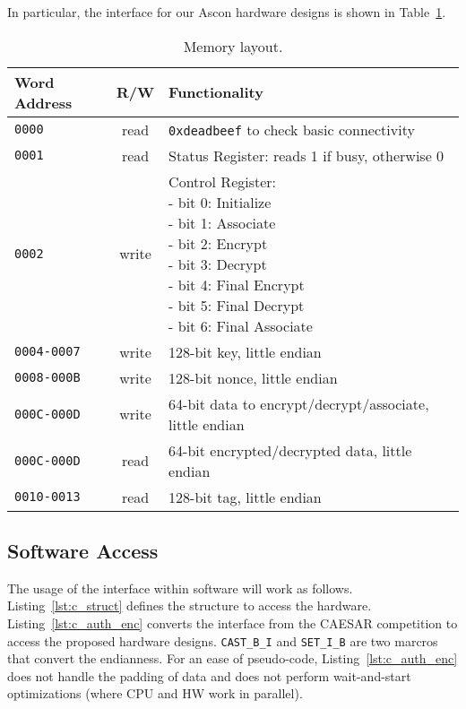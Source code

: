 \documentclass[runningheads]{llncs}
\begin{document}
In particular, the interface for our Ascon hardware designs is shown in Table~\ref{tbl:mem-layout}.

\begin{table}[htb]
\caption{Memory layout.}
\label{tbl:mem-layout}
\centering
\begin{tabular}{|l|c|l|} \hline
Word Address & R/W & Functionality \\ \hline
\texttt{0000} & read & \texttt{0xdeadbeef} to check basic connectivity \\
\texttt{0001} & read & Status Register: reads 1 if busy, otherwise 0 \\
\texttt{0002} & write & \specialcell[t]{Control Register:\\- bit 0: Initialize\\- bit 1: Associate\\- bit 2: Encrypt\\- bit 3: Decrypt\\- bit 4: Final Encrypt\\- bit 5: Final Decrypt\\- bit 6: Final Associate} \\
\texttt{0004-0007} & write & 128-bit key, little endian \\
\texttt{0008-000B} & write & 128-bit nonce, little endian \\
\texttt{000C-000D} & write & 64-bit data to encrypt/decrypt/associate, little endian \\
\texttt{000C-000D} & read & 64-bit encrypted/decrypted data, little endian \\
\texttt{0010-0013} & read & 128-bit tag, little endian \\
\hline
\end{tabular}
\end{table}%

\subsection{Software Access}

The usage of the interface within software will work as follows. Listing~\ref{lst:c_struct} defines the structure to access the hardware. Listing~\ref{lst:c_auth_enc} converts the interface from the CAESAR competition to access the proposed hardware designs. \texttt{CAST\_B\_I} and  \texttt{SET\_I\_B} are two marcros that convert the endianness. For an ease of pseudo-code, Listing~\ref{lst:c_auth_enc} does not handle the padding of data and does not perform wait-and-start optimizations (where CPU and HW work in parallel). 
\end{document}
